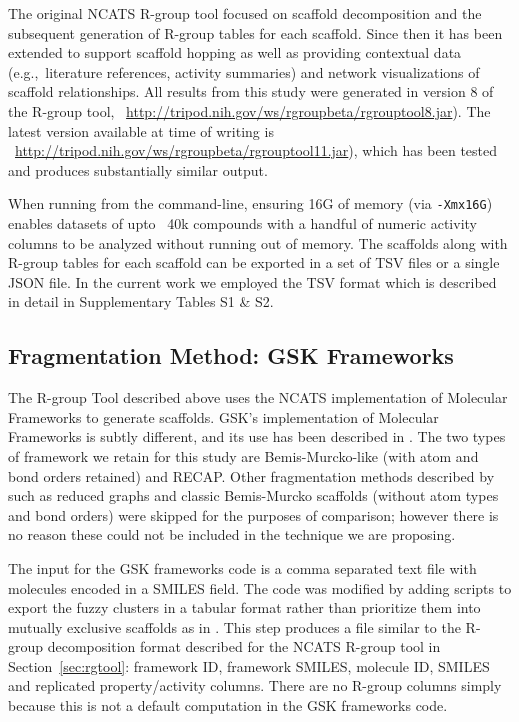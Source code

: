 \documentclass[journal=jacsat,manuscript=article]{achemso}
\newcommand*\sref[1]{Section~\ref{sec:#1}}
\newcommand*\eg{e.g.,~}
\begin{document}
The original NCATS R-group tool focused on scaffold decomposition and
the subsequent generation of R-group tables for each scaffold. Since
then it has been extended to support scaffold hopping as well as
providing contextual data (\eg literature references, activity
summaries) and network visualizations of scaffold relationships. All
results from this study were generated in version 8 of the R-group tool,
~\url{http://tripod.nih.gov/ws/rgroupbeta/rgrouptool8.jar}). The
latest version available at time of writing is
~\url{http://tripod.nih.gov/ws/rgroupbeta/rgrouptool11.jar}), which has been
tested and produces substantially similar output.

When running from the command-line, ensuring 16G of memory (via
\texttt{-Xmx16G}) enables datasets of upto ~40k compounds with a
handful of numeric activity columns to be analyzed without running out
of memory. The scaffolds along with R-group tables for each scaffold
can be exported in a set of TSV files or a single JSON file. In the
current work we employed the TSV format which is described in detail
in Supplementary Tables S1 \& S2.

\subsection{Fragmentation Method: GSK Frameworks}
\label{sec:gskframe}
The R-group Tool described above uses the NCATS implementation of
Molecular Frameworks to generate scaffolds. GSK's implementation of
Molecular Frameworks is subtly different, and its use has been
described in \citeauthor{Harper2004DDclus}. The two types of framework
we retain for this study are Bemis-Murcko-like\cite{BemisMurcko1996}
(with atom and bond orders retained) and
RECAP\cite{Lewell:1998aa}. Other fragmentation methods described by
\citeauthor{Harper2004DDclus} such as reduced graphs and classic
Bemis-Murcko scaffolds (without atom types and bond orders) were
skipped for the purposes of comparison; however there is no reason
these could not be included in the technique we are proposing.

The input for the GSK frameworks code is a comma separated text file
with molecules encoded in a SMILES field.  The code was modified by
adding scripts to export the fuzzy clusters in a tabular format rather
than prioritize them into mutually exclusive scaffolds as in
\citeauthor{Harper2004DDclus}. This step produces a file similar to
the R-group decomposition format described for the NCATS R-group tool
in \sref{rgtool}: framework ID, framework SMILES, molecule ID, SMILES
and replicated property/activity columns.  There are no R-group
columns simply because this is not a default computation in the GSK
frameworks code.
\end{document}
